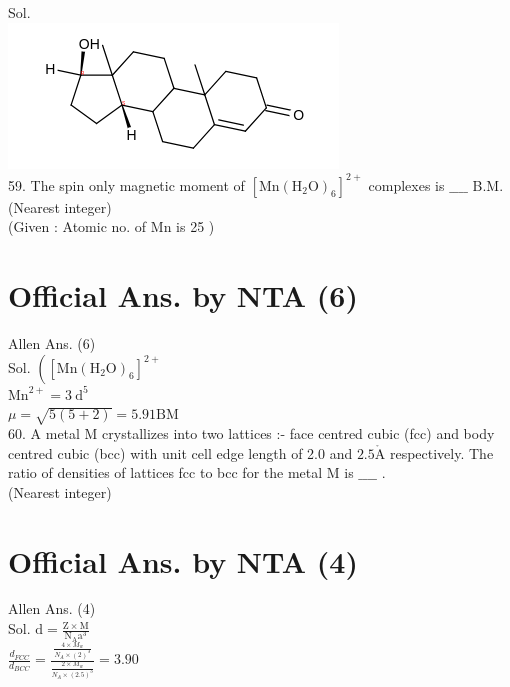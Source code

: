 \documentclass[10pt]{article}
\def\AA{\mathring{\mathrm{A}}}
\begin{document}
Sol.\\
\includegraphics{smile-37987e303bafab6946418ffe3b8944b36368f49e}\\
59. The spin only magnetic moment of \(\left[\mathrm{Mn}\left(\mathrm{H}_{2} \mathrm{O}\right)_{6}\right]^{2+}\) complexes is \(\_\_\_\_\) B.M. (Nearest integer)\\
(Given : Atomic no. of Mn is 25 )

\section*{Official Ans. by NTA (6)}
Allen Ans. (6)\\
Sol. \(\left(\left[\mathrm{Mn}\left(\mathrm{H}_{2} \mathrm{O}\right)_{6}\right]^{2+}\right.\)\\
\(\mathrm{Mn}^{2+}=3 \mathrm{~d}^{5}\)\\
\(\mu=\sqrt{5(5+2)}=5.91 \mathrm{BM}\)\\
60. A metal M crystallizes into two lattices :- face centred cubic (fcc) and body centred cubic (bcc) with unit cell edge length of 2.0 and \(2.5 \AA\) respectively. The ratio of densities of lattices fcc to bcc for the metal M is \(\_\_\_\_\) .\\
(Nearest integer)

\section*{Official Ans. by NTA (4)}
Allen Ans. (4)\\
Sol. \(\mathrm{d}=\frac{\mathrm{Z} \times \mathrm{M}}{\mathrm{N}_{\mathrm{A}} \mathrm{a}^{3}}\)\\
\(\frac{d_{F C C}}{d_{B C C}}=\frac{\frac{4 \times M_{w}}{N_{A} \times(2)^{3}}}{\frac{2 \times M_{w}}{N_{A} \times(2.5)^{3}}}=3.90\)
\end{document}
